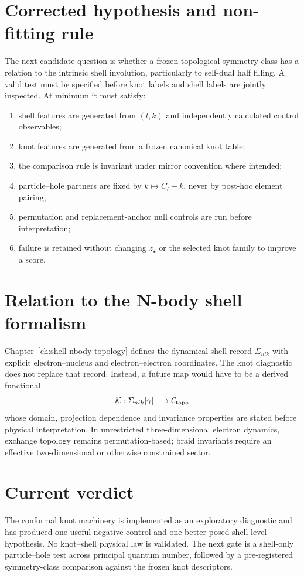 \section{Corrected hypothesis and non-fitting rule}
The next candidate question is whether a frozen topological symmetry class has a relation to the intrinsic shell involution, particularly to self-dual half filling.  A valid test must be specified before knot labels and shell labels are jointly inspected.  At minimum it must satisfy:
\begin{enumerate}
\item shell features are generated from $(l,k)$ and independently calculated control observables;
\item knot features are generated from a frozen canonical knot table;
\item the comparison rule is invariant under mirror convention where intended;
\item particle--hole partners are fixed by $k\mapsto C_l-k$, never by post-hoc element pairing;
\item permutation and replacement-anchor null controls are run before interpretation;
\item failure is retained without changing $z_\star$ or the selected knot family to improve a score.
\end{enumerate}

\section{Relation to the N-body shell formalism}
Chapter~\ref{ch:shell-nbody-topology} defines the dynamical shell record $\Sigma_{nlk}$ with explicit electron--nucleus and electron--electron coordinates.  The knot diagnostic does not replace that record.  Instead, a future map would have to be a derived functional
\begin{equation}
\mathcal K:\Sigma_{nlk}[\gamma]\longrightarrow\mathcal C_{\rm topo}
\end{equation}
whose domain, projection dependence and invariance properties are stated before physical interpretation.  In unrestricted three-dimensional electron dynamics, exchange topology remains permutation-based; braid invariants require an effective two-dimensional or otherwise constrained sector.

\section{Current verdict}
The conformal knot machinery is implemented as an exploratory diagnostic and has produced one useful negative control and one better-posed shell-level hypothesis.  No knot--shell physical law is validated.  The next gate is a shell-only particle--hole test across principal quantum number, followed by a pre-registered symmetry-class comparison against the frozen knot descriptors.
